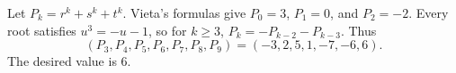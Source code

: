 Let $P_k=r^k+s^k+t^k$. Vieta's formulas give $P_0=3$, $P_1=0$, and $P_2=-2$. Every root satisfies $u^3=-u-1$, so for $k\ge3$, $P_k=-P_{k-2}-P_{k-3}$. Thus
\[(P_3,P_4,P_5,P_6,P_7,P_8,P_9)=(-3,2,5,1,-7,-6,6).\]
The desired value is $\boxed6$.
